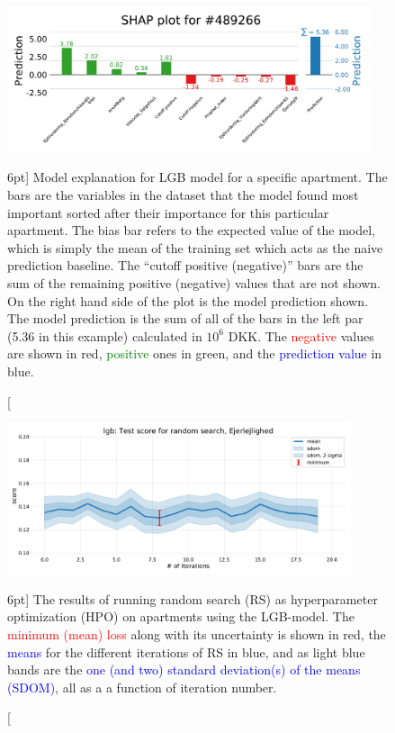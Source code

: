 \documentclass[a4paper, twoside]{tufte-book}
\newcommand{\q}[1]{``#1''}
\begin{document}
\begin{figure}
  \includegraphics[width=0.95\textwidth, trim=0 0 0 40, clip]{figures/housing/Ejerlejlighed_v17_cut_all_Ncols_all_SHAP_fig_loc=489266.pdf}
  \caption[SHAP Prediction Explanation for apartment][6pt]
          {Model explanation for LGB model for a specific apartment. The bars are the variables in the dataset that the model found most important sorted after their importance for this particular apartment. The bias bar refers to the expected value of the model, which is simply the mean of the training set which acts as the naive prediction baseline. The \q{cutoff positive (negative)} bars are the sum of the remaining positive (negative) values that are not shown. On the right hand side of the plot is the model prediction shown. The model prediction is the sum of all of the bars in the left par (5.36 in this example) calculated in $10^6$ DKK. The \textcolor{red}{negative} values are shown in red, \textcolor{green}{positive} ones in green, and the \textcolor{blue}{prediction value} in blue. 
          } 
  \label{fig:h:shap_single_apartment}
\end{figure}


\begin{figure}
  \includegraphics[width=0.9\textwidth, trim=0 0 0 40, clip]{figures/housing/Ejerlejlighed_v17_cut_all_Ncols_all_lgb_score_over_time_random.pdf}
  \caption[Hyperparameter optimization: random search results][6pt]
          {The results of running random search (RS) as hyperparameter optimization (HPO) on apartments using the LGB-model. The \textcolor{red}{minimum (mean) loss} along with its uncertainty is shown in red, the \textcolor{blue}{means} for the different iterations of RS in blue, and as light blue bands are the \textcolor{blue}{one (and two) standard deviation(s) of the means (SDOM)}, all as a a function of iteration number.  
          } 
  \label{fig:h:RS_lgb_apartment}
\end{figure}
\end{document}
